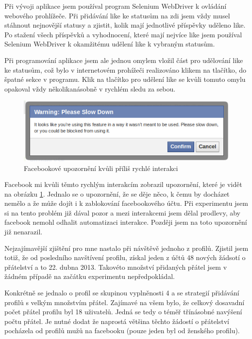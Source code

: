 \documentclass[thesis=M,czech]{FITthesis}[2013/05/10]
\begin{document}
Při vývoji aplikace jsem používal program Selenium WebDriver k ovládání webového prohlížeče. Při přidávání like ke statusům na zdi jsem vždy musel stáhnout nejnovější statusy a zjistit, kolik mají jednotlivé příspěvky uděleno like. Po stažení všech příspěvků a vyhodnocení, které mají nejvíce like jsem používal Selenium WebDriver k okamžitému udělení like k vybraným statusům. 

Při programování aplikace jsem ale jednou omylem vložil část pro udělování like ke statusům, což bylo v internetovém prohížeči realizováno klikem na tlačítko, do špatné sekce v programu. Klik na tlačítko pro udělení like se kvůli tomuto omylu opakoval vždy několikanásobně v rychlém sledu za sebou.

\begin{figure}[h]
\begin{center}
\includegraphics[width=5in]{figures/slowDown.png}
\caption{Facebookové upozornění kvůli příliš rychlé interakci}
\label{fig:slowDown}
\end{center}
\end{figure}

Facebook mi kvůli těmto rychlým interakcím zobrazil upozornění, které je vidět na obrázku \ref{fig:slowDown}. Jednalo se o upozornění, že se děje něco, k čemu by docházet nemělo a že může dojít i k zablokování facebookového účtu. Při experimentu jsem si na tento problém již dával pozor a mezi interakcemi jsem dělal prodlevy, aby facebook nemohl odhalit automatizaci interakce. Později jsem na toto upozornění již nenarazil.

Nejzajímavější zjištění pro mne nastalo při návštěvě jednoho z profilů. Zjistil jsem totiž, že od posledního navštívení profilu, získal jeden z účtů 48 nových žádsotí o přátelství a to 22. dubna 2013. Takovéto množství přidaných přátel jsem v žádném případě na začátku experimentu nepředpokládal.

Konkrétně se jednalo o profil se skupinou vyplněnosti 4 a se strategií přidávání profilů s velkým množstvím přátel. Zajímavé na všem bylo, že celkový dosavadní počet přátel profilu byl 18 uživatelů. Jedná se tedy o téměř třínásobné navýšení počtu přátel. Je nutné dodat že naprostá většina těchto žádostí o přátelství pocházela od profilů mužů na facebooku (pouze jeden byl od ženského profilu).
\end{document}
